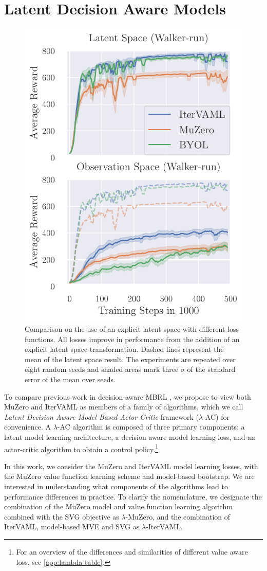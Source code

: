 \section{Latent Decision Aware Models}
\label{sec:lambda-intro}

\begin{figure}
    \centering
    \includegraphics[width=.35\textwidth]{figures/lambda/latent_2.pdf}
    \caption{Comparison on the use of an explicit latent space with different loss functions. All losses improve in performance from the addition of an explicit latent space transformation. Dashed lines represent the mean of the latent space result. The experiments are repeated over eight random seeds and shaded areas mark three $\sigma$ of the standard error of the mean over seeds.}
    \label{fig:latent}
\end{figure}

To compare previous work in decision-aware MBRL \parencite{vaml,itervaml,schrittwieser2020mastering,grimm2021proper}, we propose to view both MuZero and IterVAML as members of a family of algorithms, which we call \emph{Latent Decision Aware Model Based Actor Critic} framework ($\lambda$-AC) for convenience.
A $\lambda$-AC algorithm is composed of three primary components: a latent model learning architecture, a decision aware model learning loss, and an actor-critic algorithm to obtain a control policy.\footnote{For an overview of the differences and similarities of different value aware loss, see \autoref{app:lambda-table}.}


In this work, we consider the MuZero and IterVAML model learning losses, with the MuZero value function learning scheme and model-based bootstrap.
We are interested in understanding what components of the algorithms lead to performance differences in practice.
To clarify the nomenclature, we designate the combination of the MuZero model and value function learning algorithm combined with the SVG objective as $\lambda$-MuZero, and the combination of IterVAML, model-based MVE and SVG as $\lambda$-IterVAML.

